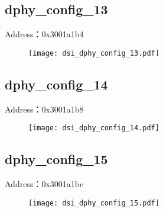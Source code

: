 \subsection{dphy\_config\_13}
\label{dsi-dphy-config-13}
Address：0x3001a1b4
 \begin{figure}[H]
\texttt{[image: dsi\_dphy\_config\_13.pdf]}
\end{figure}

\subsection{dphy\_config\_14}
\label{dsi-dphy-config-14}
Address：0x3001a1b8
 \begin{figure}[H]
\texttt{[image: dsi\_dphy\_config\_14.pdf]}
\end{figure}

\subsection{dphy\_config\_15}
\label{dsi-dphy-config-15}
Address：0x3001a1bc
 \begin{figure}[H]
\texttt{[image: dsi\_dphy\_config\_15.pdf]}
\end{figure}

